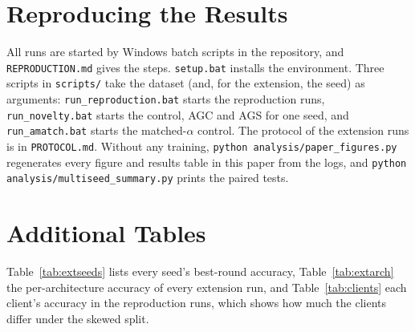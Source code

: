 \documentclass[conference]{IEEEtran}
\begin{document}
\section{Reproducing the Results}
All runs are started by Windows batch scripts in the repository, and \texttt{REPRODUCTION.md} gives the steps. \texttt{setup.bat} installs the environment. Three scripts in \texttt{scripts/} take the dataset (and, for the extension, the seed) as arguments: \texttt{run\_reproduction.bat} starts the reproduction runs, \texttt{run\_novelty.bat} starts the control, AGC and AGS for one seed, and \texttt{run\_amatch.bat} starts the matched-$\alpha$ control. The protocol of the extension runs is in \texttt{PROTOCOL.md}. Without any training, \texttt{python analysis/paper\_figures.py} regenerates every figure and results table in this paper from the logs, and \texttt{python analysis/multiseed\_summary.py} prints the paired tests.

\section{Additional Tables}

\begin{table}[t]
\centering
\caption{Extension runs: best-round averaged test accuracy (\%) for every seed.}
\label{tab:extseeds}
\footnotesize
\TabExtSeeds
\end{table}

\begin{table}[t]
\centering
\caption{Extension runs: mean test accuracy (\%) per client architecture at each run's best round.}
\label{tab:extarch}
\scriptsize
\TabExtArch
\end{table}

\begin{table}[t]
\centering
\caption{Reproduction runs: test accuracy (\%) of each client at the best round. Left: CIFAR-10. Right: CIFAR-100.}
\label{tab:clients}
\scriptsize
\setlength{\tabcolsep}{2.6pt}
\begin{minipage}[t]{0.49\textwidth}\centering\resizebox{\linewidth}{!}{\TabClientsTen}\end{minipage}\hfill
\begin{minipage}[t]{0.49\textwidth}\centering\resizebox{\linewidth}{!}{\TabClientsHundred}\end{minipage}
\end{table}

Table~\ref{tab:extseeds} lists every seed's best-round accuracy, Table~\ref{tab:extarch} the per-architecture accuracy of every extension run, and Table~\ref{tab:clients} each client's accuracy in the reproduction runs, which shows how much the clients differ under the skewed split.
\end{document}
